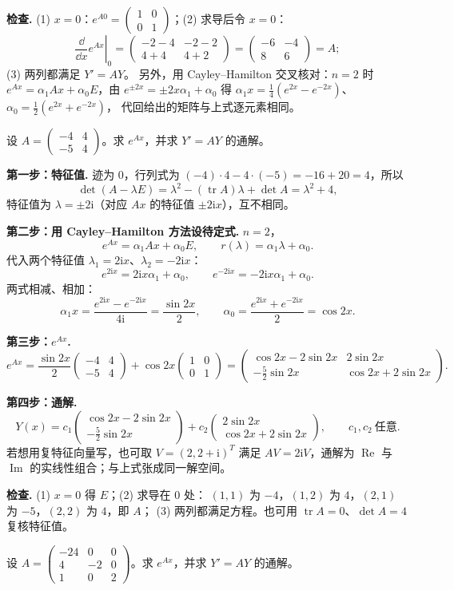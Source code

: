 \documentclass[11pt]{ctexart}
\newcommand{\pmat}[1]{\begin{pmatrix}#1\end{pmatrix}}
\newcommand{\ii}{\mathrm{i}}
\newcommand{\Ax}{Ax}
\begin{document}
\textbf{检查.} (1) $x=0$：$e^{A0}=\pmat{1&0\\0&1}$；(2) 求导后令 $x=0$：
\[
\left.\frac{\dd}{\dd x}e^{Ax}\right|_{0}
=\pmat{-2-4&-2-2\\4+4&4+2}
=\pmat{-6&-4\\8&6}=A;
\]
(3) 两列都满足 $Y'=AY$。
另外，用 Cayley--Hamilton 交叉核对：$n=2$ 时
$e^{Ax}=\alpha_1\Ax+\alpha_0E$，由 $e^{\pm2x}=\pm2x\alpha_1+\alpha_0$ 得
$\alpha_1x=\frac14(e^{2x}-e^{-2x})$、$\alpha_0=\frac12(e^{2x}+e^{-2x})$，
代回给出的矩阵与上式逐元素相同。

%
{设 $A=\pmat{-4&4\\-5&4}$。求 $e^{Ax}$，并求 $Y'=AY$ 的通解。}

\textbf{第一步：特征值.} 迹为 $0$，行列式为 $(-4)\cdot4-4\cdot(-5)=-16+20=4$，所以
\[
\det(A-\lambda E)=\lambda^2-(\operatorname{tr}A)\lambda+\det A=\lambda^2+4,
\]
特征值为 $\lambda=\pm2\ii$（对应 $\Ax$ 的特征值 $\pm2\ii x$），互不相同。

\textbf{第二步：用 Cayley--Hamilton 方法设待定式.} $n=2$，
\[
e^{Ax}=\alpha_1\Ax+\alpha_0E,\qquad r(\lambda)=\alpha_1\lambda+\alpha_0 .
\]
代入两个特征值 $\lambda_1=2\ii x$、$\lambda_2=-2\ii x$：
\[
e^{2\ii x}=2\ii x\alpha_1+\alpha_0,\qquad
e^{-2\ii x}=-2\ii x\alpha_1+\alpha_0 .
\]
两式相减、相加：
\[
\alpha_1x=\frac{e^{2\ii x}-e^{-2\ii x}}{4\ii}=\frac{\sin 2x}{2},\qquad
\alpha_0=\frac{e^{2\ii x}+e^{-2\ii x}}2=\cos 2x .
\]

\textbf{第三步：$e^{Ax}$.}
\[
e^{Ax}=\frac{\sin2x}{2}\pmat{-4&4\\-5&4}+\cos2x\pmat{1&0\\0&1}
=\pmat{\cos2x-2\sin2x&2\sin2x\\[2pt]-\frac52\sin2x&\cos2x+2\sin2x}.
\]

\textbf{第四步：通解.}
\[
Y(x)=c_1\pmat{\cos2x-2\sin2x\\[2pt]-\frac52\sin2x}
+c_2\pmat{2\sin2x\\[2pt]\cos2x+2\sin2x},\qquad c_1,c_2\ \text{任意}.
\]
若想用复特征向量写，也可取 $V=(2,2+\ii)^T$ 满足 $AV=2\ii V$，通解为
$\operatorname{Re}$ 与 $\operatorname{Im}$ 的实线性组合；与上式张成同一解空间。

\textbf{检查.} (1) $x=0$ 得 $E$；(2) 求导在 $0$ 处：
$(1,1)$ 为 $-4$，$(1,2)$ 为 $4$，$(2,1)$ 为 $-5$，$(2,2)$ 为 $4$，即 $A$；
(3) 两列都满足方程。也可用 $\operatorname{tr}A=0$、$\det A=4$ 复核特征值。

%
{设 $A=\pmat{-24&0&0\\4&-2&0\\1&0&2}$。求 $e^{Ax}$，并求 $Y'=AY$ 的通解。}
\end{document}
